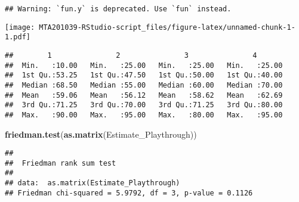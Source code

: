 \documentclass[
]{article}
\newenvironment{Shaded}{\begin{snugshade}}{\end{snugshade}}
\newcommand{\CommentTok}[1]{\textcolor[rgb]{0.56,0.35,0.01}{\textit{#1}}}
\newcommand{\KeywordTok}[1]{\textcolor[rgb]{0.13,0.29,0.53}{\textbf{#1}}}
\newcommand{\NormalTok}[1]{#1}
\newcommand{\OperatorTok}[1]{\textcolor[rgb]{0.81,0.36,0.00}{\textbf{#1}}}
\newcommand{\OtherTok}[1]{\textcolor[rgb]{0.56,0.35,0.01}{#1}}
\newcommand{\StringTok}[1]{\textcolor[rgb]{0.31,0.60,0.02}{#1}}
\begin{document}
\begin{verbatim}
## Warning: `fun.y` is deprecated. Use `fun` instead.
\end{verbatim}

\texttt{[image: MTA201039-RStudio-script\_files/figure-latex/unnamed-chunk-1-1.pdf]}

\begin{Shaded}
\end{Shaded}

\begin{verbatim}
##        1               2               3               4        
##  Min.   :10.00   Min.   :25.00   Min.   :25.00   Min.   :25.00  
##  1st Qu.:53.25   1st Qu.:47.50   1st Qu.:50.00   1st Qu.:40.00  
##  Median :68.50   Median :55.00   Median :60.00   Median :70.00  
##  Mean   :59.06   Mean   :56.12   Mean   :58.62   Mean   :62.69  
##  3rd Qu.:71.25   3rd Qu.:70.00   3rd Qu.:71.25   3rd Qu.:80.00  
##  Max.   :90.00   Max.   :95.00   Max.   :80.00   Max.   :95.00
\end{verbatim}

\begin{Shaded}
\begin{Highlighting}[]
\KeywordTok{friedman.test}\NormalTok{(}\KeywordTok{as.matrix}\NormalTok{(Estimate_Playthrough))}
\end{Highlighting}
\end{Shaded}

\begin{verbatim}
## 
##  Friedman rank sum test
## 
## data:  as.matrix(Estimate_Playthrough)
## Friedman chi-squared = 5.9792, df = 3, p-value = 0.1126
\end{verbatim}
\end{document}
